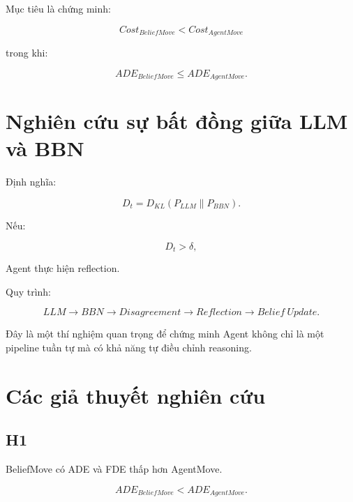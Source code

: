 \documentclass[11pt,a4paper]{article}
\begin{document}
	Mục tiêu là chứng minh:
	
	\begin{equation}
		Cost_{BeliefMove}
		<
		Cost_{AgentMove}
	\end{equation}
	
	trong khi:
	
	\begin{equation}
		ADE_{BeliefMove}
		\leq
		ADE_{AgentMove}.
	\end{equation}
	
	\section{Nghiên cứu sự bất đồng giữa LLM và BBN}
	
	Định nghĩa:
	
	\begin{equation}
		D_t
		=
		D_{KL}
		\left(
		P_{LLM}
		\|
		P_{BBN}
		\right).
	\end{equation}
	
	Nếu:
	
	\begin{equation}
		D_t>\delta,
	\end{equation}
	
	Agent thực hiện reflection.
	
	Quy trình:
	
	\begin{equation}
		LLM
		\rightarrow
		BBN
		\rightarrow
		Disagreement
		\rightarrow
		Reflection
		\rightarrow
		Belief\ Update.
	\end{equation}
	
	Đây là một thí nghiệm quan trọng để chứng minh Agent không chỉ là một
	pipeline tuần tự mà có khả năng tự điều chỉnh reasoning.
	
	\section{Các giả thuyết nghiên cứu}
	
	\subsection{H1}
	
	BeliefMove có ADE và FDE thấp hơn AgentMove.
	
	\begin{equation}
		ADE_{BeliefMove}
		<
		ADE_{AgentMove}.
	\end{equation}
	
\end{document}
